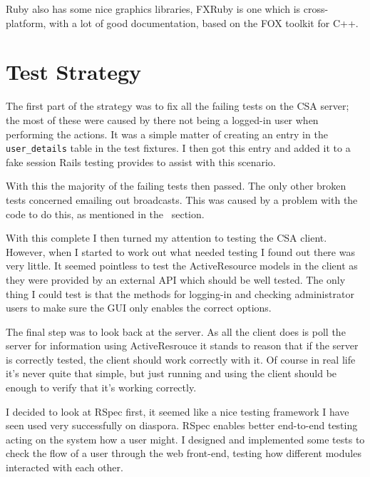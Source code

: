 \documentclass{article}
\begin{document}
Ruby also has some nice graphics libraries, FXRuby is one which is cross-platform, with a
lot of good documentation, based on the FOX toolkit for C++.

\clearpage
\section{Test Strategy}
The first part of the strategy was to fix all the failing tests on the CSA server; the 
most of these were caused by there not being a logged-in user when performing the 
actions. It was a simple matter of creating an entry in the \verb$user_details$ table in
the test fixtures. I then got this entry and added it to a fake session Rails testing
provides to assist with this scenario.\cite{buren07}

With this the majority of the failing tests then passed. The only other broken tests
concerned emailing out broadcasts. This was caused by a problem with the code to do this,
as mentioned in the ~section.

With this complete I then turned my attention to testing the CSA client. However, when
I started to work out what needed testing I found out there was very little. It seemed
pointless to test the ActiveResource models in the client as they were provided by an
external API which should be well tested. The only thing I could test is that the methods
for logging-in and checking administrator users to make sure the GUI only enables the
correct options.

The final step was to look back at the server. As all the client does is poll the server
for information using ActiveResrouce it stands to reason that if the server is correctly
tested, the client should work correctly with it. Of course in real life it's never quite
that simple, but just running and using the client should be enough to verify that it's
working correctly.

I decided to look at RSpec first, it seemed like a nice testing framework I have seen 
used very successfully on diaspora. RSpec enables better end-to-end testing acting on the
system how a user might. I designed and implemented some tests to check the flow of a 
user through the web front-end, testing how different modules interacted with each other.

\clearpage
\end{document}
